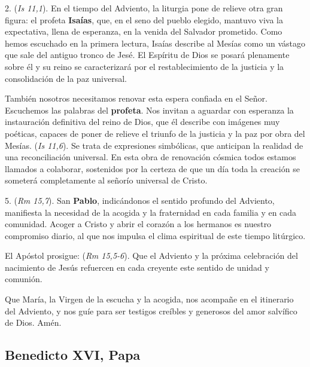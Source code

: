 2.  (\emph{Is 11,1}). En el tiempo del Adviento, la liturgia pone de relieve otra gran figura: el profeta \textbf{Isaías}, que, en el seno del pueblo elegido, mantuvo viva la expectativa, llena de esperanza, en la venida del Salvador prometido. Como hemos escuchado en la primera lectura, Isaías describe al Mesías como un vástago que sale del antiguo tronco de Jesé. El Espíritu de Dios se posará plenamente sobre él y su reino se caracterizará por el restablecimiento de la justicia y la consolidación de la paz universal.

También nosotros necesitamos renovar esta espera confiada en el Señor. Escuchemos las palabras del \textbf{profeta}. Nos invitan a aguardar con esperanza la instauración definitiva del reino de Dios, que él describe con imágenes muy poéticas, capaces de poner de relieve el triunfo de la justicia y la paz por obra del Mesías.  (\emph{Is 11,6}). Se trata de expresiones simbólicas, que anticipan la realidad de una reconciliación universal. En esta obra de renovación cósmica todos estamos llamados a colaborar, sostenidos por la certeza de que un día toda la creación se someterá completamente al señorío universal de Cristo.

5.  (\emph{Rm 15,7}). San \textbf{Pablo}, indicándonos el sentido profundo del Adviento, manifiesta la necesidad de la acogida y la fraternidad en cada familia y en cada comunidad. Acoger a Cristo y abrir el corazón a los hermanos es nuestro compromiso diario, al que nos impulsa el clima espiritual de este tiempo litúrgico.

El Apóstol prosigue:  (\emph{Rm 15,5-6}). Que el Adviento y la próxima celebración del nacimiento de Jesús refuercen en cada creyente este sentido de unidad y comunión.

Que María, la Virgen de la escucha y la acogida, nos acompañe en el itinerario del Adviento, y nos guíe para ser testigos creíbles y generosos del amor salvífico de Dios. Amén.

\subsection{Benedicto XVI, Papa}

